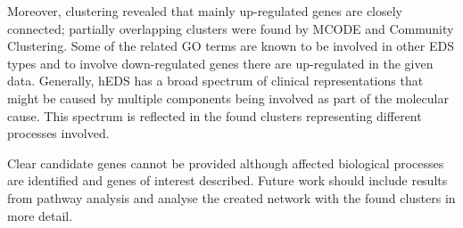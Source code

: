 Moreover, clustering revealed that mainly up-regulated genes are closely connected; partially overlapping clusters were found by MCODE and Community Clustering. Some of the related GO terms are known to be involved in other EDS types and to involve down-regulated genes there are up-regulated in the given data. Generally, hEDS has a broad spectrum of clinical representations that might be caused by multiple components being involved as part of the molecular cause. This spectrum is reflected in the found clusters representing different processes involved.

Clear candidate genes cannot be provided although affected biological processes are identified and genes of interest described. Future work should include results from pathway analysis and analyse the created network with the found clusters in more detail.


